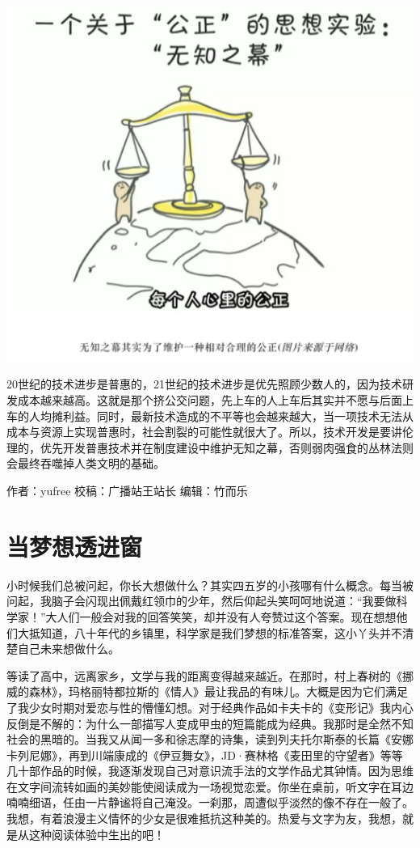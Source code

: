 \documentclass[]{book}
\begin{document}
\includegraphics[width=6.67in]{images/wuzhi4}

20世纪的技术进步是普惠的，21世纪的技术进步是优先照顾少数人的，因为技术研发成本越来越高。这就是那个挤公交问题，先上车的人上车后其实并不愿与后面上车的人均摊利益。同时，最新技术造成的不平等也会越来越大，当一项技术无法从成本与资源上实现普惠时，社会割裂的可能性就很大了。所以，技术开发是要讲伦理的，优先开发普惠技术并在制度建设中维护无知之幕，否则弱肉强食的丛林法则会最终吞噬掉人类文明的基础。

作者：yufree 校稿：广播站王站长 编辑：竹而乐

\section{当梦想透进窗}

小时候我们总被问起，你长大想做什么？其实四五岁的小孩哪有什么概念。每当被问起，我脑子会闪现出佩戴红领巾的少年，然后仰起头笑呵呵地说道：``我要做科学家！''大人们一般会对我的回答笑笑，却并没有人夸赞过这个答案。现在想想他们大抵知道，八十年代的乡镇里，科学家是我们梦想的标准答案，这小丫头并不清楚自己未来想做什么。

等读了高中，远离家乡，文学与我的距离变得越来越近。在那时，村上春树的《挪威的森林》，玛格丽特都拉斯的《情人》最让我品的有味儿。大概是因为它们满足了我少女时期对爱恋与性的懵懂幻想。对于经典作品如卡夫卡的《变形记》我内心反倒是不解的：为什么一部描写人变成甲虫的短篇能成为经典。我那时是全然不知社会的黑暗的。当我又从闻一多和徐志摩的诗集，读到列夫托尔斯泰的长篇《安娜卡列尼娜》，再到川端康成的《伊豆舞女》，JD·赛林格《麦田里的守望者》等等几十部作品的时候，我逐渐发现自己对意识流手法的文学作品尤其钟情。因为思维在文字间流转如画的美妙能使阅读成为一场视觉恋爱。你坐在桌前，听文字在耳边喃喃细语，任由一片静谧将自己淹没。一刹那，周遭似乎淡然的像不存在一般了。我想，有着浪漫主义情怀的少女是很难抵抗这种美的。热爱与文字为友，我想，就是从这种阅读体验中生出的吧！
\end{document}
